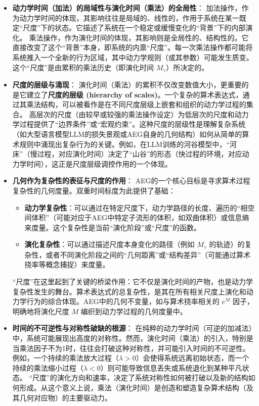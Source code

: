 \documentclass[UTF8]{ctexart}
\begin{document}
\begin{itemize}
    \item \textbf{动力学时间（加法）的局域性与演化时间（乘法）的全局性}：
    加法操作，作为动力学时间的体现，其影响往往是局域的、线性的，作用于系统在某一既定“尺度”下的状态。它描述了系统在一个稳定或缓慢变化的“背景”下的内部演化。
    乘法操作，作为演化时间的体现，其影响则是全局性的、结构性的。它直接改变了这个“背景”本身，即系统的内禀“尺度”。每一次乘法操作都可能将系统推入一个全新的行为区域，其中动力学规则（或其参数）可能发生质变。这个“尺度”是由累积的乘法历史（即演化时间 $M_\gamma$）所决定的。

    \item \textbf{尺度的层级与涌现}：
    演化时间（乘法）的累积不仅改变数值大小，更重要的是它建立了\textbf{尺度的层级 (hierarchy of scales)}。一个复杂的算术表达式，通过其乘法结构，可以被看作是在不同尺度层级上嵌套和组织的动力学过程的集合。
    高层次的尺度（由较早或较强的乘法操作设定）为低层次的尺度和动力学过程提供了“边界条件”或“宏观约束”。这种尺度的层级性是理解复杂系统（如大型语言模型LLM的损失景观或AEG自身的几何结构）如何从简单的算术规则中涌现出复杂行为的关键。例如，在LLM训练的河谷模型中，“河床”（慢过程，对应演化时间）决定了“山谷”的形态（快过程的环境，对应动力学时间）\cite{Liu2025NTL}，这正是尺度层级调控作用的一个体现。

    \item \textbf{几何作为复杂性的表征与尺度的作用}：
    AEG的一个核心目标是寻求算术过程复杂性的几何度量。双重时间标度为此提供了基础：
    \begin{itemize}
        \item \textbf{动力学复杂性}：可以通过在特定尺度下，动力学路径的长度、遍历的“相空间体积”（可能对应于AEG中特定子流形的体积，如双曲体积）或信息熵来度量。这个复杂性是当前“演化阶段”或“尺度”的函数。
        \item \textbf{演化复杂性}：可以通过描述尺度本身变化的路径（例如 $M_\gamma$ 的轨迹）的复杂性，或者不同演化阶段之间的“几何距离”或“结构差异”（可能通过算术挠率等概念捕捉）来度量。
    \end{itemize}
    “尺度”在这里起到了关键的桥梁作用：它不仅是演化时间的产物，也是动力学复杂性发生的舞台。算术表达式的总复杂性，是其在所有相关尺度上演化和动力学行为的综合体现。AEG中的几何不变量，如与算术挠率相关的 $e^M$ 因子，明确地将演化尺度 $M$ 编织到动力学过程的几何度量中。

    \item \textbf{时间的不可逆性与对称性破缺的根源}：
    在纯粹的动力学时间（可逆的加减法）中，系统可能展现出高度的对称性。然而，演化时间（乘法）的引入，特别是当乘法因子不为1时，往往会打破这种对称性，并可能引入时间的不可逆性。例如，一个持续的乘法放大过程（$\lambda > 0$）会使得系统远离初始状态，而一个持续的乘法缩小过程（$\lambda < 0$）则可能导致信息丢失或系统退化到某种平凡状态。
    “尺度”的演化方向和速率，决定了系统对称性如何被打破以及新的结构如何形成。从这个意义上说，乘法（演化时间）是创造和塑造复杂算术结构（及其几何对应物）的主要驱动力。
\end{itemize}
\end{document}
